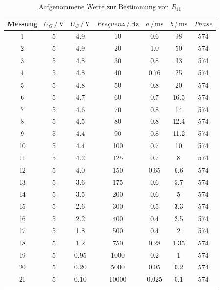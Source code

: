 \begin{table}[H]
\normalsize

\centering
{}
\begin{tabular}{c c c c c c c}
\toprule
        Messung & $U_G \,/\,\si{\volt}$ & $U_C \,/\,\si{\volt}$ & $Frequenz \,/\,\si{\hertz}$ & $a\,/\, \si{\milli\second}$ & $b\,/\, \si{\milli\second}$ & $Phase$ \\
        \midrule
        1   & 5 & 4.9 & 10 & 0.6 & 98 & 574 \\
        2   & 5 & 4.9 & 20 & 1.0 & 50 & 574 \\
        3   & 5 & 4.8 & 30  & 0.8 & 33 & 574 \\ 
        4   & 5 & 4.8 & 40 & 0.76 & 25 & 574 \\
        5   & 5 & 4.8 & 50 & 0.8 & 20 & 574 \\
        6   & 5 & 4.7 & 60 & 0.7 & 16.5 & 574 \\
        7   & 5 & 4.6 & 70 & 0.8 & 14 & 574 \\
        8   & 5 & 4.5 & 80 & 0.8 & 12.4 & 574 \\
        9   & 5 & 4.4 & 90 & 0.8 & 11.2 & 574 \\
        10  & 5 & 4.4 & 100 & 0.7 & 10 & 574 \\
        11  & 5 & 4.2 & 125 & 0.7 & 8 & 574 \\
        12  & 5 & 4.0 & 150 & 0.65 & 6.6 & 574 \\
        13  & 5 & 3.6 & 175 & 0.6 & 5.7 & 574 \\
        14  & 5 & 3.5 & 200 & 0.6 & 5 & 574 \\
        15  & 5 & 2.6 & 300 & 0.5 & 3.3 & 574 \\
        16  & 5 & 2.2 & 400 & 0.4 & 2.5 & 574 \\
        17  & 5 & 1.8 & 500 & 0.4 & 2 & 574 \\
        18  & 5 & 1.2 & 750 & 0.28 & 1.35 & 574 \\
        19  & 5 & 0.95 & 1000 & 0.2 & 1 & 574 \\
        20  & 5 & 0.20 & 5000 & 0.05 & 0.2 & 574 \\
        21  & 5 & 0.10& 10000 & 0.025 & 0.1 & 574 \\



        
\bottomrule

\end{tabular}

\caption{Aufgenommene Werte zur Bestimmung von $R_{11}$}
\label{tab:1}
\end{table}